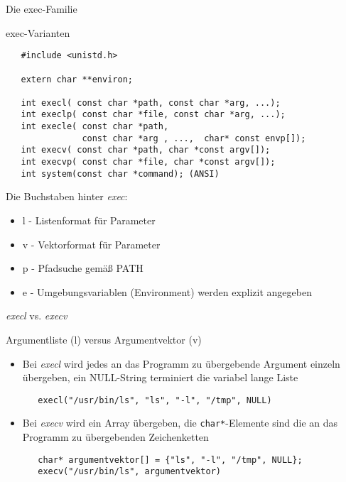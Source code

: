 \documentclass[utf8,9pt]{beamer}
\begin{document}
\begin{frame}[fragile]{Die exec-Familie}{}

  \begin{block}{\small exec-Varianten}
    \footnotesize
\begin{verbatim}
   #include <unistd.h>

   extern char **environ;

   int execl( const char *path, const char *arg, ...);
   int execlp( const char *file, const char *arg, ...);
   int execle( const char *path,
               const char *arg , ...,  char* const envp[]);
   int execv( const char *path, char *const argv[]);
   int execvp( const char *file, char *const argv[]);
   int system(const char *command); (ANSI)
\end{verbatim}
  \end{block}

\vspace*{2em}

\small
Die Buchstaben hinter {\em exec\/}:
\begin{itemize}
\item l - Listenformat für Parameter
\item v - Vektorformat für Parameter
\item p - Pfadsuche gemäß PATH
\item e - Umgebungsvariablen (Environment) werden explizit angegeben 
\end{itemize}
\end{frame}





\begin{frame}[fragile]{{\em execl\/} vs. {\em execv\/}}{}
  \begin{block}{\small Argumentliste (l) versus Argumentvektor (v)}
    \footnotesize
    \begin{itemize}
    \item Bei {\em execl\/} wird jedes an das Programm zu übergebende
      Argument einzeln übergeben, ein NULL-String terminiert die
      variabel lange Liste
\begin{verbatim}
   execl("/usr/bin/ls", "ls", "-l", "/tmp", NULL)
\end{verbatim}
    \item Bei {\em execv\/} wird ein Array
      übergeben, die {\tt char*}-Elemente sind die an das Programm zu übergebenden
      Zeichenketten
\begin{verbatim}
   char* argumentvektor[] = {"ls", "-l", "/tmp", NULL};
   execv("/usr/bin/ls", argumentvektor)
\end{verbatim}
 
    \end{itemize}

  \end{block}
\end{frame}
\end{document}
